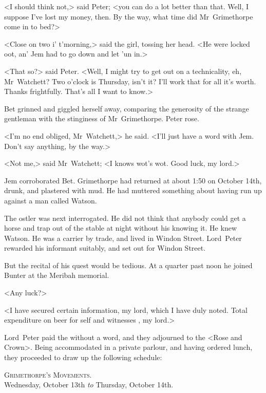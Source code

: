 <I should think not,> said Peter; <you can do a lot better than that. Well, I suppose I've lost my money, then. By the way, what time did Mr~Grimethorpe come in to bed?>

<Close on two i' t'morning,> said the girl, tossing her head. <He were locked oot, an' Jem had to go down and let 'un in.>

<That so?> said Peter. <Well, I might try to get out on a technicality, eh, Mr~Watchett? Two o'clock is Thursday, isn't it? I'll work that for all it's worth. Thanks frightfully. That's all I want to know.>

Bet grinned and giggled herself away, comparing the generosity of the strange gentleman with the stinginess of Mr~Grimethorpe. Peter rose.

<I'm no end obliged, Mr~Watchett,> he said. <I'll just have a word with Jem. Don't say anything, by the way.>

<Not me,> said Mr~Watchett; <I knows wot's wot. Good luck, my lord.>

Jem corroborated Bet. Grimethorpe had returned at about 1:50  on October 14th, drunk, and plastered with mud. He had muttered something about having run up against a man called Watson.

The ostler was next interrogated. He did not think that anybody could get a horse and trap out of the stable at night without his knowing it. He knew Watson. He was a carrier by trade, and lived in Windon Street. Lord~Peter rewarded his informant suitably, and set out for Windon Street.

But the recital of his quest would be tedious. At a quarter past noon he joined Bunter at the Meribah memorial.

<Any luck?>

<I have secured certain information, my lord, which I have duly noted. Total expenditure on beer for self and witnesses , my lord.>

Lord~Peter paid the  without a word, and they adjourned to the <Rose and Crown>. Being accommodated in a private parlour, and having ordered lunch, they proceeded to draw up the following schedule:

\begin{a4}
\clearpage
\end{a4}

\begin{center}
\textsc{Grimethorpe's Movements.}\\Wednesday, October 13th \textit{to} Thursday, October 14th.
\end{center}


